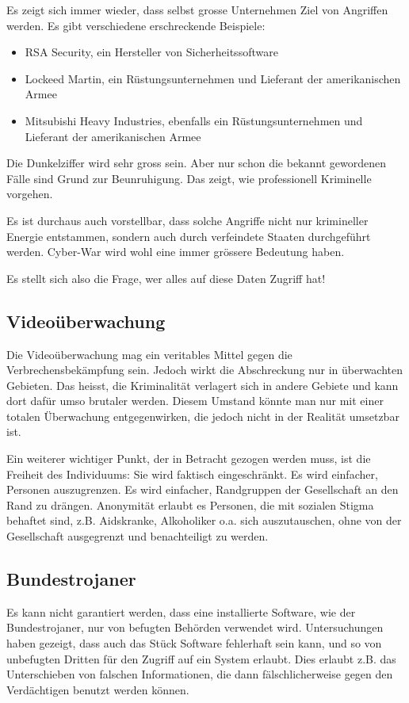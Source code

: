 Es zeigt sich immer wieder, dass selbst grosse Unternehmen Ziel von Angriffen
werden. Es gibt verschiedene erschreckende Beispiele:
\begin{itemize}
\item RSA Security, ein Hersteller von Sicherheitssoftware
\item Lockeed Martin, ein Rüstungsunternehmen und Lieferant der amerikanischen Armee
\item Mitsubishi Heavy Industries, ebenfalls ein Rüstungsunternehmen und
Lieferant der amerikanischen Armee
\end{itemize}

Die Dunkelziffer wird sehr gross sein. Aber nur schon die bekannt gewordenen
Fälle sind Grund zur Beunruhigung. Das zeigt, wie professionell
Kriminelle vorgehen.

Es ist durchaus auch vorstellbar, dass solche Angriffe nicht nur krimineller
Energie entstammen, sondern auch durch verfeindete Staaten durchgeführt werden.
Cyber-War wird wohl eine immer grössere Bedeutung haben.

Es stellt sich also die Frage, wer alles auf diese Daten Zugriff hat!
\subsection*{Videoüberwachung}
Die Videoüberwachung mag ein veritables Mittel gegen die Verbrechensbekämpfung sein.
Jedoch wirkt die Abschreckung nur in überwachten Gebieten.
Das heisst, die Kriminalität verlagert sich in andere Gebiete und
kann dort dafür umso brutaler werden.
Diesem Umstand könnte man nur mit einer totalen Überwachung entgegenwirken,
die jedoch nicht in der Realität umsetzbar ist.

Ein weiterer wichtiger Punkt, der in Betracht gezogen werden muss,
ist die Freiheit des Individuums: Sie wird faktisch eingeschränkt. 
Es wird einfacher, Personen auszugrenzen.
Es wird einfacher, Randgruppen der Gesellschaft an den Rand zu drängen.
Anonymität erlaubt es Personen, die mit sozialen Stigma behaftet sind,
z.B. Aidskranke, Alkoholiker o.a. sich auszutauschen, ohne von der
Gesellschaft ausgegrenzt und benachteiligt zu werden.

\subsection*{Bundestrojaner}
Es kann nicht garantiert werden, dass eine installierte Software,
wie der Bundestrojaner, nur von befugten Behörden verwendet wird. 
Untersuchungen haben gezeigt, dass auch das Stück Software fehlerhaft 
sein kann, und so von unbefugten Dritten für den Zugriff auf ein System 
erlaubt. Dies erlaubt z.B. das
Unterschieben von falschen Informationen, die dann fälschlicherweise gegen
den Verdächtigen benutzt werden können.

